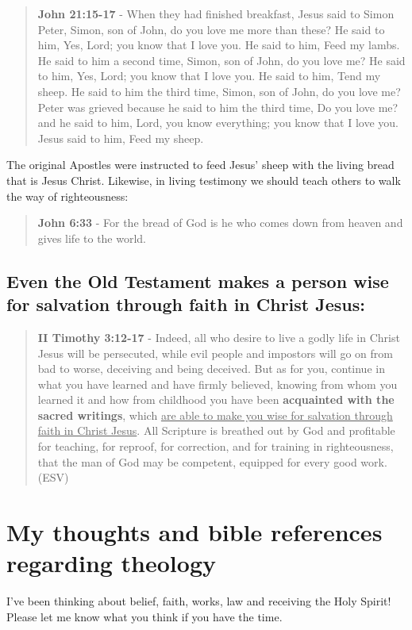\documentclass[11pt]{article}
\begin{document}
\begin{quote}
\textbf{John 21:15-17} - When they had finished breakfast, Jesus said to Simon Peter, Simon, son of John, do you love me more than these? He said to him, Yes, Lord; you know that I love you. He said to him, Feed my lambs. He said to him a second time, Simon, son of John, do you love me? He said to him, Yes, Lord; you know that I love you. He said to him, Tend my sheep. He said to him the third time, Simon, son of John, do you love me? Peter was grieved because he said to him the third time, Do you love me? and he said to him, Lord, you know everything; you know that I love you. Jesus said to him, Feed my sheep.
\end{quote}

The original Apostles were instructed to feed Jesus' sheep with the living bread that is Jesus Christ. Likewise, in living testimony we should teach others to walk the way of righteousness:

\begin{quote}
\textbf{John 6:33} - For the bread of God is he who comes down from heaven and gives life to the world.
\end{quote}

\subsection{Even the Old Testament makes a person wise for salvation through faith in Christ Jesus:}
\label{sec:org05eb0e0}

\begin{quote}
\textbf{II Timothy 3:12-17} - Indeed, all who desire to live a godly life in Christ Jesus will be persecuted, while evil people and impostors will go on from bad to worse, deceiving and being deceived. But as for you, continue in what you have learned and have firmly believed, knowing from whom you learned it and how from childhood you have been \textbf{acquainted with the sacred writings}, which \uline{are able to make you wise for salvation through faith in Christ Jesus}. All Scripture is breathed out by God and profitable for teaching, for reproof, for correction, and for training in righteousness, that the man of God may be competent, equipped for every good work. (ESV)
\end{quote}

\section{My thoughts and bible references regarding theology}
\label{sec:orge6d2039}
I've been thinking about belief, faith, works, law and receiving the Holy Spirit!
Please let me know what you think if you have the time.
\end{document}
